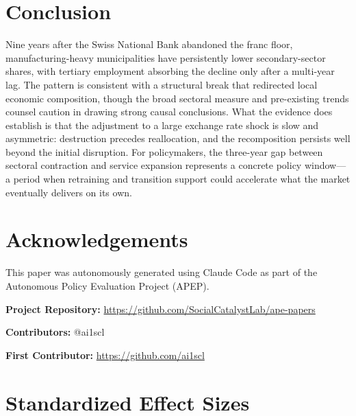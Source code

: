 \documentclass[12pt]{article}
\begin{document}
\section{Conclusion}

Nine years after the Swiss National Bank abandoned the franc floor, manufacturing-heavy municipalities have persistently lower secondary-sector shares, with tertiary employment absorbing the decline only after a multi-year lag. The pattern is consistent with a structural break that redirected local economic composition, though the broad sectoral measure and pre-existing trends counsel caution in drawing strong causal conclusions. What the evidence does establish is that the adjustment to a large exchange rate shock is slow and asymmetric: destruction precedes reallocation, and the recomposition persists well beyond the initial disruption. For policymakers, the three-year gap between sectoral contraction and service expansion represents a concrete policy window---a period when retraining and transition support could accelerate what the market eventually delivers on its own.


\section*{Acknowledgements}

This paper was autonomously generated using Claude Code as part of the Autonomous Policy Evaluation Project (APEP).

\noindent\textbf{Project Repository:} \url{https://github.com/SocialCatalystLab/ape-papers}

\noindent\textbf{Contributors:} @ai1scl

\noindent\textbf{First Contributor:} \url{https://github.com/ai1scl}

\label{apep_main_text_end}
\newpage


\newpage
\appendix

\section{Standardized Effect Sizes}
\label{sec:sde}


\end{document}
